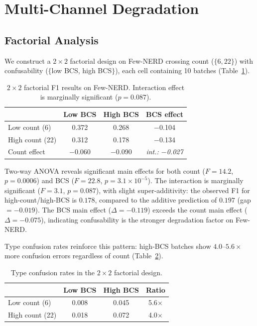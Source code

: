 \documentclass[11pt,a4paper]{article}
\begin{document}
\section{Multi-Channel Degradation}
\label{sec:multichannel}

\subsection{Factorial Analysis}
\label{sec:factorial}

We construct a $2{\times}2$ factorial design on Few-NERD crossing count ($\{6, 22\}$) with confusability ($\{$low BCS, high BCS$\}$), each cell containing 10 batches (Table~\ref{tab:factorial}).

\begin{table}[t]
\centering
\small
\caption{$2{\times}2$ factorial F1 results on Few-NERD. Interaction effect is marginally significant ($p{=}0.087$).}
\label{tab:factorial}
\begin{tabular}{lccc}
\toprule
 & Low BCS & High BCS & BCS effect \\
\midrule
Low count (6)  & 0.372 & 0.268 & $-$0.104 \\
High count (22) & 0.312 & 0.178 & $-$0.134 \\
\midrule
Count effect & $-$0.060 & $-$0.090 & \textit{int.: $-$0.027} \\
\bottomrule
\end{tabular}
\end{table}

Two-way ANOVA reveals significant main effects for both count ($F{=}14.2$, $p{=}0.0006$) and BCS ($F{=}22.8$, $p{=}3.1{\times}10^{-5}$).
The interaction is marginally significant ($F{=}3.1$, $p{=}0.087$), with slight super-additivity: the observed F1 for high-count/high-BCS is $0.178$, compared to the additive prediction of $0.197$ (gap $= -0.019$).
The BCS main effect ($\Delta{=}{-}0.119$) exceeds the count main effect ($\Delta{=}{-}0.075$), indicating confusability is the stronger degradation factor on Few-NERD.

Type confusion rates reinforce this pattern: high-BCS batches show $4.0$--$5.6\times$ more confusion errors regardless of count (Table~\ref{tab:confusion-rate}).

\begin{table}[t]
\centering
\small
\caption{Type confusion rates in the $2{\times}2$ factorial design.}
\label{tab:confusion-rate}
\begin{tabular}{lccc}
\toprule
 & Low BCS & High BCS & Ratio \\
\midrule
Low count (6)  & 0.008 & 0.045 & 5.6$\times$ \\
High count (22) & 0.018 & 0.072 & 4.0$\times$ \\
\bottomrule
\end{tabular}
\end{table}
\end{document}
